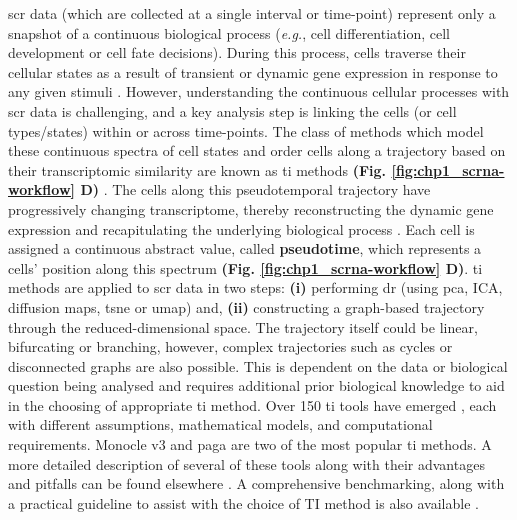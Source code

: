 \par \gls{scr} data (which are collected at a single interval or time-point) represent only a snapshot of a continuous biological process (\textit{e.g.}, cell differentiation, cell development or cell fate decisions). During this process, cells traverse their cellular states as a result of transient or dynamic gene expression in response to any given stimuli \textbf{\cite{zeng_what_2022}}. However, understanding the continuous cellular processes with \gls{scr} data is challenging, and a key analysis step is linking the cells (or cell types/states) within or across time-points. The class of methods which model these continuous spectra of cell states and order cells along a trajectory based on their transcriptomic similarity are known as \gls{ti} methods \textbf{(Fig. \ref{fig:chp1_scrna-workflow} D)} \textbf{\cite{ weiler_guide_2022}}. The cells along this pseudotemporal trajectory have progressively changing transcriptome, thereby reconstructing the dynamic gene expression and recapitulating the underlying biological process \textbf{\cite{hou_statistical_2023}}. Each cell is assigned a continuous abstract value, called \textbf{pseudotime}, which represents a cells’ position along this spectrum \textbf{(Fig. \ref{fig:chp1_scrna-workflow} D)}.
\gls{ti} methods are applied to \gls{scr} data in two steps: \textbf{(i)} performing \gls{dr} (using \gls{pca}, ICA, diffusion maps, \gls{tsne} or \gls{umap}) and, \textbf{(ii)} constructing a graph-based trajectory through the reduced-dimensional space. The trajectory itself could be linear, bifurcating or branching, however, complex trajectories such as cycles or disconnected graphs are also possible. This is dependent on the data or biological question being analysed and requires additional prior biological knowledge to aid in the choosing of appropriate \gls{ti} method. Over 150 \gls{ti} tools have emerged \textbf{\cite{noauthor_scrna-tools_nodate,zappia_exploring_2018}}, each with different assumptions, mathematical models, and computational requirements. Monocle v3 \textbf{\cite{cao_single-cell_2019}} and \gls{paga} \textbf{\cite{wolf_paga_2019}} are two of the most popular \gls{ti} methods. A more detailed description of several of these tools along with their advantages and pitfalls can be found elsewhere \textbf{\cite{ding_temporal_2022,deconinck_recent_2021,cannoodt_computational_2016,saelens_comparison_2019}}. A comprehensive benchmarking, along with a practical guideline to assist with the choice of TI method is also available \textbf{\cite{saelens_comparison_2019}}. %

